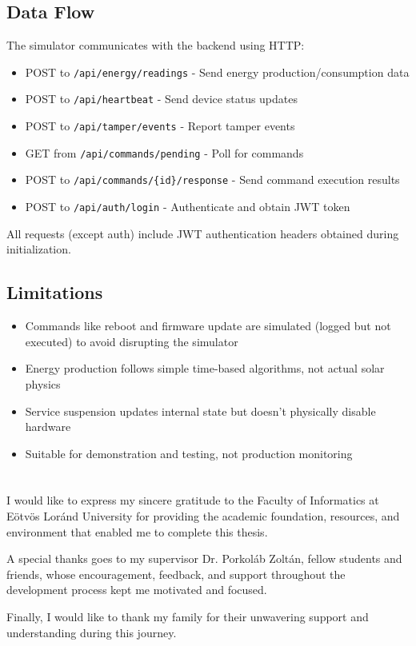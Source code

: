 \documentclass[
]{elteikthesis}[2024/04/26]
\begin{document}
\section{Data Flow}
The simulator communicates with the backend using HTTP:
\begin{itemize}
    \item POST to \texttt{/api/energy/readings} - Send energy production/consumption data
    \item POST to \texttt{/api/heartbeat} - Send device status updates
    \item POST to \texttt{/api/tamper/events} - Report tamper events
    \item GET from \texttt{/api/commands/pending} - Poll for commands
    \item POST to \texttt{/api/commands/\{id\}/response} - Send command execution results
    \item POST to \texttt{/api/auth/login} - Authenticate and obtain JWT token
\end{itemize}

All requests (except auth) include JWT authentication headers obtained during initialization.

\section{Limitations}
\begin{itemize}
    \item Commands like reboot and firmware update are simulated (logged but not executed) to avoid disrupting the simulator
    \item Energy production follows simple time-based algorithms, not actual solar physics
    \item Service suspension updates internal state but doesn't physically disable hardware
    \item Suitable for demonstration and testing, not production monitoring
\end{itemize}

\cleardoublepage

\chapter*{\acklabel}
I would like to express my sincere gratitude to the Faculty of Informatics at Eötvös Loránd University for providing the academic foundation, resources, and environment that enabled me to complete this thesis.

A special thanks goes to my supervisor Dr. Porkoláb Zoltán,  fellow students and friends, whose encouragement, feedback, and support throughout the development process kept me motivated and focused.

Finally, I would like to thank my family for their unwavering support and understanding during this journey.

\cleardoublepage

\printbibliography[heading=bibintoc]

\cleardoublepage
\end{document}
